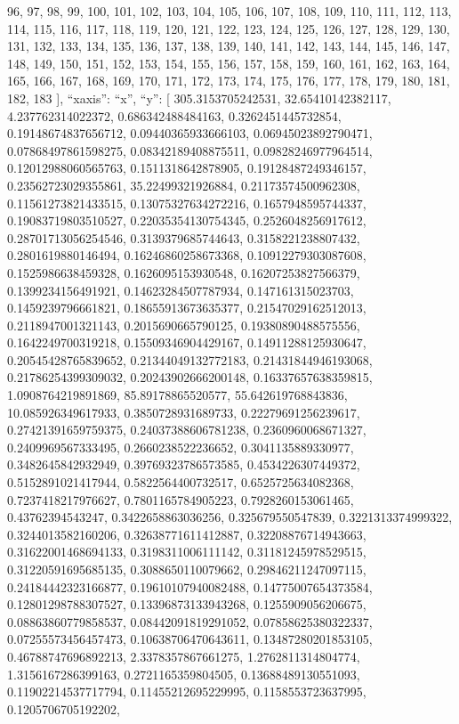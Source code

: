 \documentclass[
]{article}
\begin{document}
96, 97, 98, 99, 100, 101, 102, 103, 104, 105, 106, 107, 108, 109, 110,
111, 112, 113, 114, 115, 116, 117, 118, 119, 120, 121, 122, 123, 124,
125, 126, 127, 128, 129, 130, 131, 132, 133, 134, 135, 136, 137, 138,
139, 140, 141, 142, 143, 144, 145, 146, 147, 148, 149, 150, 151, 152,
153, 154, 155, 156, 157, 158, 159, 160, 161, 162, 163, 164, 165, 166,
167, 168, 169, 170, 171, 172, 173, 174, 175, 176, 177, 178, 179, 180,
181, 182, 183 {]}, ``xaxis'': ``x'', ``y'': {[} 305.3153705242531,
32.65410142382117, 4.237762314022372, 0.686342488484163,
0.3262451445732854, 0.19148674837656712, 0.09440365933666103,
0.06945023892790471, 0.07868497861598275, 0.08342189408875511,
0.09828246977964514, 0.12012988060565763, 0.1511318642878905,
0.19128487249346157, 0.23562723029355861, 35.22499321926884,
0.21173574500962308, 0.11561273821433515, 0.13075327634272216,
0.1657948595744337, 0.19083719803510527, 0.22035354130754345,
0.2526048256917612, 0.28701713056254546, 0.3139379685744643,
0.3158221238807432, 0.2801619880146494, 0.16246860258673368,
0.10912279303087608, 0.1525986638459328, 0.1626095153930548,
0.16207253827566379, 0.1399234156491921, 0.14623284507787934,
0.147161315023703, 0.1459239796661821, 0.18655913673635377,
0.21547029162512013, 0.2118947001321143, 0.2015690665790125,
0.19380890488575556, 0.1642249700319218, 0.15509346904429167,
0.14911288125930647, 0.20545428765839652, 0.21344049132772183,
0.21431844946193068, 0.21786254399309032, 0.20243902666200148,
0.16337657638359815, 1.0908764219891869, 85.89178865520577,
55.642619768843836, 10.085926349617933, 0.3850728931689733,
0.22279691256239617, 0.27421391659759375, 0.24037388606781238,
0.2360960068671327, 0.2409969567333495, 0.2660238522236652,
0.3041135889330977, 0.3482645842932949, 0.39769323786573585,
0.4534226307449372, 0.5152891021417944, 0.5822564400732517,
0.6525725634082368, 0.7237418217976627, 0.7801165784905223,
0.7928260153061465, 0.43762394543247, 0.3422658863036256,
0.325679550547839, 0.3221313374999322, 0.3244013582160206,
0.32638771611412887, 0.32208876714943663, 0.31622001468694133,
0.3198311006111142, 0.31181245978529515, 0.31220591695685135,
0.3088650110079662, 0.29846211247097115, 0.24184442323166877,
0.19610107940082488, 0.14775007654373584, 0.12801298788307527,
0.13396873133943268, 0.1255909056206675, 0.08863860779858537,
0.08442091819291052, 0.07858625380322337, 0.07255573456457473,
0.10638706470643611, 0.13487280201853105, 0.46788747696892213,
2.3378357867661275, 1.2762811314804774, 1.3156167286399163,
0.2721165359804505, 0.13688489130551093, 0.11902214537717794,
0.11455212695229995, 0.1158553723637995, 0.1205706705192202,
\end{document}
